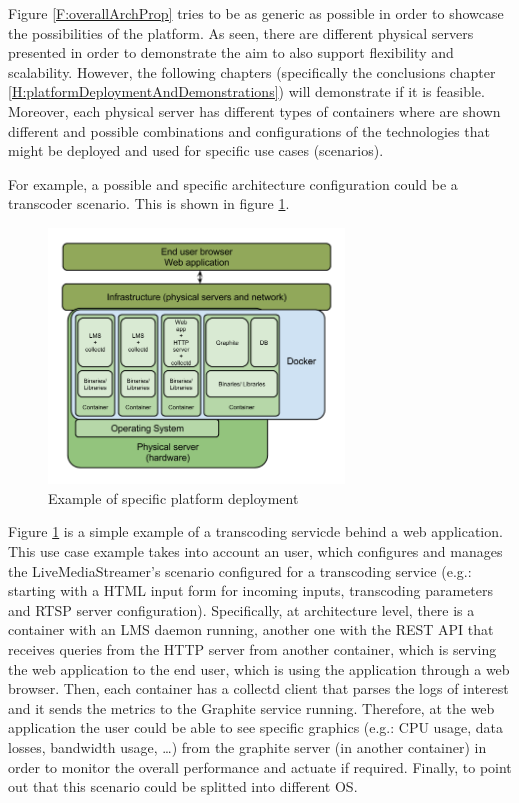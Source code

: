 Figure \ref{F:overallArchProp} tries to be as generic as possible in order to showcase the possibilities of the platform. As seen, there are different physical servers presented in order to demonstrate the aim to also support flexibility and scalability. However, the following chapters (specifically the conclusions chapter \ref{H:platformDeploymentAndDemonstrations}) will demonstrate if it is feasible. 
Moreover, each physical server has different types of containers where are shown different and possible combinations and configurations of the technologies that might be deployed and used for specific use cases (scenarios).

For example, a possible and specific architecture configuration could be a transcoder scenario. This is shown in figure \ref{F:exampleArch}.

\begin{figure}[!htb]
\begin{center}
\includegraphics[width=0.7\textwidth]{./images/exampleArch.png}
\caption{Example of specific platform deployment}
\label{F:exampleArch}
\end{center}
\end{figure}

Figure \ref{F:exampleArch} is a simple example of a transcoding servicde behind a web application. This use case example takes into account an user, which configures and manages the LiveMediaStreamer's scenario configured for a transcoding service (e.g.: starting with a HTML input form for incoming inputs, transcoding parameters and RTSP server configuration). Specifically, at architecture level, there is a container with an LMS daemon running, another one with the REST API that receives queries from the HTTP server from another container, which is serving the web application to the end user, which is using the application through a web browser. Then, each container has a collectd client that parses the logs of interest and it sends the metrics to the Graphite service running. Therefore, at the web application the user could be able to see specific graphics (e.g.: CPU usage, data losses, bandwidth usage, \ldots) from the graphite server (in another container) in order to monitor the overall performance and actuate if required. Finally, to point out that this scenario could be splitted into different OS. 

